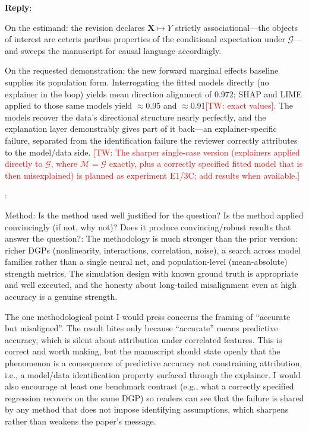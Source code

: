 \documentclass[11pt]{article}
\newcommand{\tw}[1]{\textcolor{red}{[TW: #1]}}
\newcounter{se}[section]
\newcounter{reviewer}
\newcounter{point}[reviewer]
\renewcommand{\thepoint}{R\,\thereviewer.\arabic{point}}
\newenvironment{point}{
    \refstepcounter{point} \bigskip \noindent {\textbf{\thepoint}}: \rmfamily \itshape
}{\medskip}
\newenvironment{reply}
 {\par\medskip \noindent \begin{sf}\textbf{Reply}:\ }
 {\medskip \end{sf}}
\begin{document}
\begin{reply}
{\color{red}
On the estimand: the revision declares $\mathbf{X}\mapsto Y$ strictly associational---the objects of interest are ceteris paribus properties of the conditional expectation under $\mathcal{G}$---and sweeps the manuscript for causal language accordingly.

On the requested demonstration: the new forward marginal effects baseline supplies its population form. Interrogating the fitted models directly (no explainer in the loop) yields mean direction alignment of 0.972; SHAP and LIME applied to those same models yield $\approx$0.95 and $\approx$0.91\tw{exact values}. The models recover the data's directional structure nearly perfectly, and the explanation layer demonstrably gives part of it back---an explainer-specific failure, separated from the identification failure the reviewer correctly attributes to the model/data side. \tw{The sharper single-case version (explainers applied directly to $\mathcal{G}$, where $\mathcal{M}=\mathcal{G}$ exactly, plus a correctly specified fitted model that is then misexplained) is planned as experiment E1/3C; add results when available.}
}
\end{reply}


\begin{point}
Method: Is the method used well justified for the question? Is the method applied convincingly (if not, why not)? Does it produce convincing/robust results that answer the question?: The methodology is much stronger than the prior version: richer DGPs (nonlinearity, interactions, correlation, noise), a search across model families rather than a single neural net, and population-level (mean-absolute) strength metrics. The simulation design with known ground truth is appropriate and well executed, and the honesty about long-tailed misalignment even at high accuracy is a genuine strength.

The one methodological point I would press concerns the framing of ``accurate but misaligned''. The result bites only because ``accurate'' means predictive accuracy, which is silent about attribution under correlated features. This is correct and worth making, but the manuscript should state openly that the phenomenon is a consequence of predictive accuracy not constraining attribution, i.e., a model/data identification property surfaced through the explainer. I would also encourage at least one benchmark contrast (e.g., what a correctly specified regression recovers on the same DGP) so readers can see that the failure is shared by any method that does not impose identifying assumptions, which sharpens rather than weakens the paper's message.
\end{point}
\end{document}
